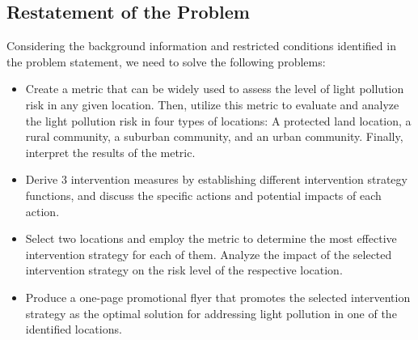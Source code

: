 \documentclass[12pt]{article}
\begin{document}


\subsection{Restatement of the Problem}
Considering the background information and restricted conditions identified in the problem statement, we need to solve the following problems:
\begin{itemize}
	\item  Create a metric that can be widely used to assess the level of light pollution risk in any given location. Then, utilize this metric to evaluate and analyze the light pollution risk in four types of locations: A protected land location, a rural community, a suburban community, and an urban community. Finally, interpret the results of the metric.
	\item  Derive 3 intervention measures by establishing different intervention strategy functions, and discuss the specific actions and potential impacts of each action.
	\item  Select two locations and employ the metric to determine the most effective intervention strategy for each of them. Analyze the impact of the selected intervention strategy on the risk level of the respective location.
    \item  Produce a one-page promotional flyer that promotes the selected intervention strategy as the optimal solution for addressing light pollution in one of the identified locations.
\end{itemize}
\end{document}
